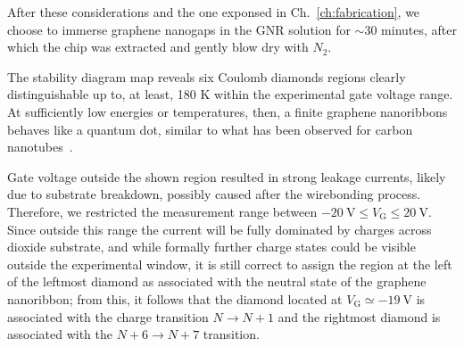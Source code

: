 
After these considerations and the one exponsed in Ch.~\ref{ch:fabrication}, we choose to immerse graphene nanogaps in the \gls{GNR} solution for $\sim$30 minutes, after which the chip was extracted and gently blow dry with $N_2$.


The stability diagram map reveals six Coulomb diamonds regions clearly distinguishable up to, at least, 180 K within the experimental gate voltage range. At sufficiently low energies or temperatures, then, a finite graphene nanoribbons behaves like a quantum dot, similar to what has been observed for carbon nanotubes~\cite{bockrath1997single, nygaard2000kondo,buitelaar2002multiwall, postma2001carbon, liang2002shell, guinea2005many}.

Gate voltage outside the shown region resulted in strong leakage currents, likely due to substrate breakdown, possibly caused after the wirebonding process. Therefore, we restricted the measurement range between $\SI{-20}{\V}\le V_\textrm{G}\le\SI{+20}{\V}$. Since outside this range the current will be fully dominated by charges across dioxide substrate, and while formally further charge states could be visible outside the experimental window, it is still correct to assign the region at the left of the leftmost diamond as associated with the neutral state of the graphene nanoribbon; from this, it follows that the diamond located at $V_\textrm{G}\simeq\SI{-19}{\V}$ is associated with the charge transition $N \rightarrow N+1$ and the rightmost diamond is associated with the $N+6 \rightarrow N+7$ transition.

